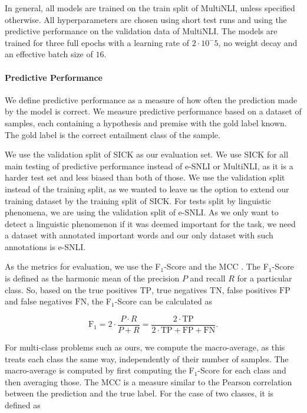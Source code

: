 In general, all models are trained on the train split of \acs{MultiNLI}, unless specified otherwise. All hyperparameters are chosen using short test runs and using the predictive performance on the validation data of \acs{MultiNLI}. The models are trained for three full epochs with a learning rate of $2 \cdot 10^-5$, no weight decay and an effective batch size of $16$.

\paragraph{Predictive Performance}
We define predictive performance as a measure of how often the prediction made by the model is correct. We measure predictive performance based on a dataset of samples, each containing a hypothesis and premise with the gold label known. The gold label is the correct entailment class of the sample.

We use the validation split of \ac{SICK} as our evaluation set. We use \ac{SICK} for all main testing of predictive performance instead of \ac{e-SNLI} or \ac{MultiNLI}, as it is a harder test set and less biased than both of those. We use the validation split instead of the training split, as we wanted to leave us the option to extend our training dataset by the training split of \ac{SICK}. For tests split by linguistic phenomena, we are using the validation split of \ac{e-SNLI}. As we only want to detect a linguistic phenomenon if it was deemed important for the task, we need a dataset with annotated important words and our only dataset with such annotations is \ac{e-SNLI}.

As the metrics for evaluation, we use the F$_1$-Score and the \ac{MCC} \cite{mcc}. The F$_1$-Score is defined as the harmonic mean of the precision $P$ and recall $R$ for a particular class. So, based on the true positives $\mathrm{TP}$, true negatives $\mathrm{TN}$, false positives $\mathrm{FP}$ and false negatives $\mathrm{FN}$, the F$_1$-Score can be calculated as 

$$\text{F}_1 = 2\cdot \frac{P \cdot R}{P + R} = \frac{2 \cdot \mathrm{TP}}{2\cdot \mathrm{TP} + \mathrm{FP} + \mathrm{FN}}.$$

For multi-class problems such as ours, we compute the macro-average, as this treats each class the same way, independently of their number of samples. The macro-average is computed by first computing the F$_1$-Score for each class and then averaging those. The \ac{MCC} is a measure similar to the Pearson correlation between the prediction and the true label. For the case of two classes, it is defined as 

